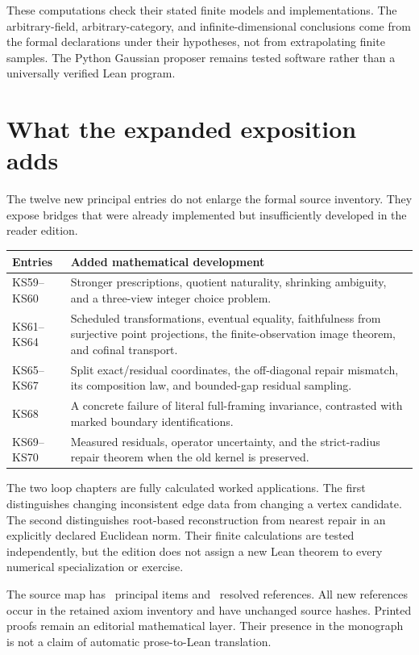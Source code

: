 \documentclass[11pt]{article}
\begin{document}
These computations check their stated finite models and implementations. The arbitrary-field, arbitrary-category, and infinite-dimensional conclusions come from the formal declarations under their hypotheses, not from extrapolating finite samples. The Python Gaussian proposer remains tested software rather than a universally verified Lean program.

\section{What the expanded exposition adds}
The twelve new principal entries do not enlarge the formal source inventory. They expose bridges that were already implemented but insufficiently developed in the reader edition.

\begin{center}
\begin{tabularx}{\linewidth}{@{}p{.18\linewidth}X@{}}
\toprule Entries & Added mathematical development\\\midrule
KS59--KS60 & Stronger prescriptions, quotient naturality, shrinking ambiguity, and a three-view integer choice problem.\\
KS61--KS64 & Scheduled transformations, eventual equality, faithfulness from surjective point projections, the finite-observation image theorem, and cofinal transport.\\
KS65--KS67 & Split exact/residual coordinates, the off-diagonal repair mismatch, its composition law, and bounded-gap residual sampling.\\
KS68 & A concrete failure of literal full-framing invariance, contrasted with marked boundary identifications.\\
KS69--KS70 & Measured residuals, operator uncertainty, and the strict-radius repair theorem when the old kernel is preserved.\\
\bottomrule
\end{tabularx}
\end{center}

The two loop chapters are fully calculated worked applications. The first distinguishes changing inconsistent edge data from changing a vertex candidate. The second distinguishes root-based reconstruction from nearest repair in an explicitly declared Euclidean norm. Their finite calculations are tested independently, but the edition does not assign a new Lean theorem to every numerical specialization or exercise.

The source map has \EditionClaims\ principal items and \EditionReferences\ resolved references. All new references occur in the retained axiom inventory and have unchanged source hashes. Printed proofs remain an editorial mathematical layer. Their presence in the monograph is not a claim of automatic prose-to-Lean translation.
\end{document}
